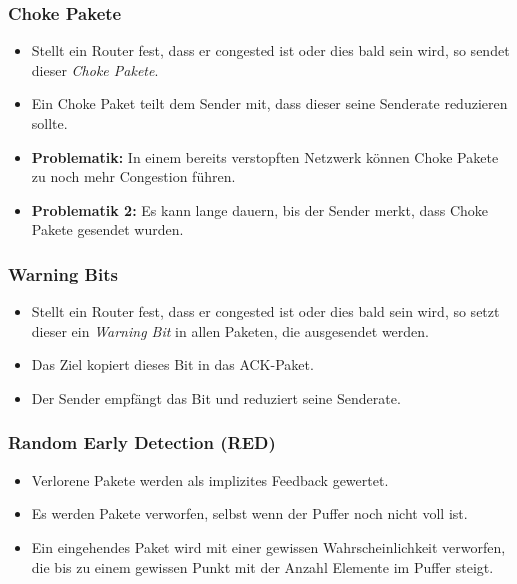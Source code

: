             \subsubsection{Choke Pakete}
                \begin{itemize}
                	\item Stellt ein Router fest, dass er congested ist oder dies bald sein wird, so sendet dieser \textit{Choke Pakete}.
                	\item Ein Choke Paket teilt dem Sender mit, dass dieser seine Senderate reduzieren sollte.
                	\item \textbf{Problematik:} In einem bereits verstopften Netzwerk können Choke Pakete zu noch mehr Congestion führen.
                	\item \textbf{Problematik 2:} Es kann lange dauern, bis der Sender merkt, dass Choke Pakete gesendet wurden.
                \end{itemize}

            \subsubsection{Warning Bits}
                \begin{itemize}
                	\item Stellt ein Router fest, dass er congested ist oder dies bald sein wird, so setzt dieser ein \textit{Warning Bit} in allen Paketen, die ausgesendet werden.
                	\item Das Ziel kopiert dieses Bit in das ACK-Paket.
                	\item Der Sender empfängt das Bit und reduziert seine Senderate.
                \end{itemize}

            \subsubsection{Random Early Detection (RED)}
                \begin{itemize}
                	\item Verlorene Pakete werden als implizites Feedback gewertet.
                	\item Es werden Pakete verworfen, selbst wenn der Puffer noch nicht voll ist.
                	\item Ein eingehendes Paket wird mit einer gewissen Wahrscheinlichkeit verworfen, die bis zu einem gewissen Punkt mit der Anzahl Elemente im Puffer steigt.
                \end{itemize}

